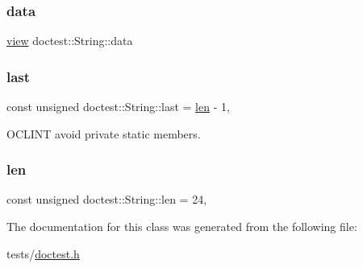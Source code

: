 \mbox{\label{classdoctest_1_1String_a5c77ed634a1b81aea739a73fb01d986a}} 
\subsubsection{\texorpdfstring{data}{data}}
{\footnotesize\ttfamily \hyperlink{structdoctest_1_1String_1_1view}{view} doctest\+::\+String\+::data}

\mbox{\label{classdoctest_1_1String_a7e34a25b9fed27da2b69f75449ca510c}} 
\subsubsection{\texorpdfstring{last}{last}}
{\footnotesize\ttfamily const unsigned doctest\+::\+String\+::last = \hyperlink{classdoctest_1_1String_a1025b38e7785f5541af920a237b744db}{len} -\/ 1\hspace{0.3cm}{\ttfamily [static]}, {\ttfamily [private]}}



O\+C\+L\+I\+NT avoid private static members. 

\mbox{\label{classdoctest_1_1String_a1025b38e7785f5541af920a237b744db}} 
\subsubsection{\texorpdfstring{len}{len}}
{\footnotesize\ttfamily const unsigned doctest\+::\+String\+::len = 24\hspace{0.3cm}{\ttfamily [static]}, {\ttfamily [private]}}



The documentation for this class was generated from the following file\+:\begin{DoxyCompactItemize}
\item 
tests/\hyperlink{doctest_8h}{doctest.\+h}\end{DoxyCompactItemize}
